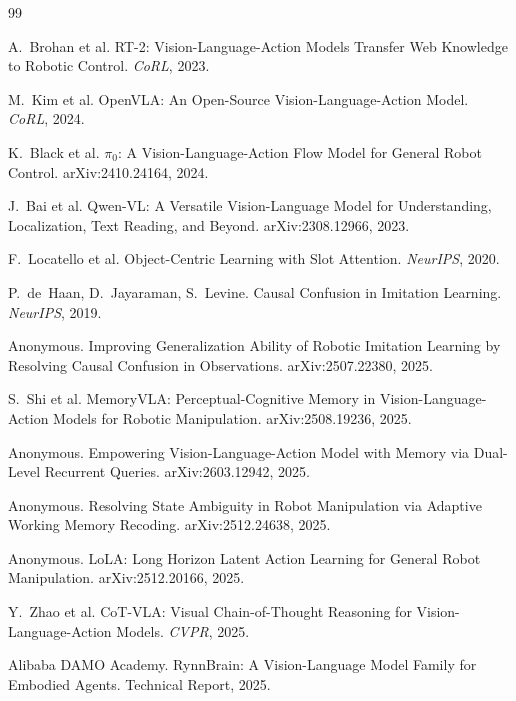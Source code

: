 \documentclass[11pt]{article}
\begin{document}

\begin{thebibliography}{99}

A.~Brohan et al.
\newblock RT-2: Vision-Language-Action Models Transfer Web Knowledge to Robotic Control.
\newblock \emph{CoRL}, 2023.

M.~Kim et al.
\newblock OpenVLA: An Open-Source Vision-Language-Action Model.
\newblock \emph{CoRL}, 2024.

K.~Black et al.
\newblock $\pi_0$: A Vision-Language-Action Flow Model for General Robot Control.
\newblock arXiv:2410.24164, 2024.

J.~Bai et al.
\newblock Qwen-VL: A Versatile Vision-Language Model for Understanding, Localization, Text Reading, and Beyond.
\newblock arXiv:2308.12966, 2023.

F.~Locatello et al.
\newblock Object-Centric Learning with Slot Attention.
\newblock \emph{NeurIPS}, 2020.

P.~de~Haan, D.~Jayaraman, S.~Levine.
\newblock Causal Confusion in Imitation Learning.
\newblock \emph{NeurIPS}, 2019.

Anonymous.
\newblock Improving Generalization Ability of Robotic Imitation Learning by Resolving Causal Confusion in Observations.
\newblock arXiv:2507.22380, 2025.

S.~Shi et al.
\newblock MemoryVLA: Perceptual-Cognitive Memory in Vision-Language-Action Models for Robotic Manipulation.
\newblock arXiv:2508.19236, 2025.

Anonymous.
\newblock Empowering Vision-Language-Action Model with Memory via Dual-Level Recurrent Queries.
\newblock arXiv:2603.12942, 2025.

Anonymous.
\newblock Resolving State Ambiguity in Robot Manipulation via Adaptive Working Memory Recoding.
\newblock arXiv:2512.24638, 2025.

Anonymous.
\newblock LoLA: Long Horizon Latent Action Learning for General Robot Manipulation.
\newblock arXiv:2512.20166, 2025.

Y.~Zhao et al.
\newblock CoT-VLA: Visual Chain-of-Thought Reasoning for Vision-Language-Action Models.
\newblock \emph{CVPR}, 2025.

Alibaba DAMO Academy.
\newblock RynnBrain: A Vision-Language Model Family for Embodied Agents.
\newblock Technical Report, 2025.

\end{thebibliography}
\end{document}
